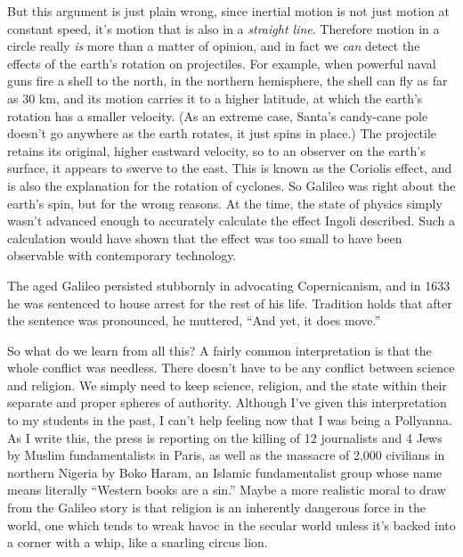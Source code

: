 But this argument is just plain wrong, since inertial motion is not just motion at constant
speed, it's motion that is also in a \emph{straight line}. Therefore motion in a circle really
\emph{is} more than a matter of opinion, and in fact we \emph{can} detect the effects of
the earth's rotation on projectiles. For example, when powerful naval guns fire a shell to the
north, in the northern hemisphere, the shell can fly as far as 30 km, and its motion carries it
to a higher latitude, at which the earth's rotation has a smaller velocity. (As an extreme
case, Santa's candy-cane pole doesn't go anywhere as the earth rotates, it just spins in place.)
The projectile retains its original, higher eastward velocity, so to an observer on the earth's
surface, it appears to swerve to the east. This is known as the Coriolis effect, and is also
the explanation for the rotation of cyclones. So Galileo was right about the earth's spin, but
for the wrong reasons. At the time, the state of physics simply wasn't advanced enough to
accurately calculate the effect Ingoli described. Such a calculation would have shown that the
effect was too small to have been observable with contemporary technology.

The aged Galileo persisted stubbornly in advocating Copernicanism, and in
1633 he was sentenced to house arrest for the rest of his life. Tradition holds that after the
sentence was pronounced, he muttered, ``And yet, it does move.''

So what do we learn from all this? A fairly common interpretation is that the whole conflict
was needless. There doesn't have to be any conflict between science and religion. We simply need
to keep science, religion, and the state within their separate and proper spheres of authority.
Although I've given this interpretation to my students in the past, I can't help feeling now
that I was being a Pollyanna. As I write this, the press is reporting on the killing of 12
journalists and 4 Jews by Muslim fundamentalists in Paris, as well as the massacre of
2,000 civilians in northern Nigeria by Boko Haram, an Islamic fundamentalist group whose
name means literally ``Western books are a sin.'' Maybe a more realistic moral to draw from
the Galileo story is that religion is an inherently dangerous force in the world, one which
tends to wreak havoc in the secular world unless it's backed into a corner with a whip,
like a snarling circus lion.
